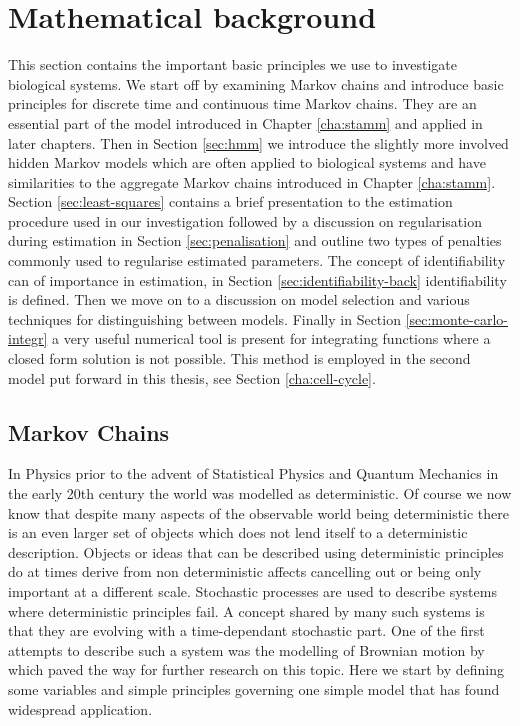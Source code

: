 \section{Mathematical background}
\label{sec:math-backgr}

This section contains the important basic principles we use to investigate biological systems. We start off by examining Markov chains and introduce basic principles for discrete time and continuous time Markov chains. They  are an essential part of the model introduced in Chapter \ref{cha:stamm} and applied in later chapters. Then in Section \ref{sec:hmm} we introduce the slightly more involved hidden Markov models which are often applied to biological systems and have similarities to the aggregate Markov chains introduced in Chapter \ref{cha:stamm}. Section \ref{sec:least-squares} contains a brief presentation to the estimation procedure used in our investigation followed by a discussion on regularisation during estimation in Section \ref{sec:penalisation} and outline two types of penalties commonly used to regularise estimated parameters. The concept of identifiability can of importance in estimation, in Section \ref{sec:identifiability-back} identifiability is defined. Then we move on to a discussion on model selection and various techniques for distinguishing between models. Finally in Section \ref{sec:monte-carlo-integr} a very useful numerical tool is present for integrating functions where a closed form solution is not possible. This method is employed in the second model put forward in this thesis, see Section \ref{cha:cell-cycle}.

\subsection{Markov Chains}
\label{sec:markov-chains}

In Physics prior to the advent of Statistical Physics and Quantum Mechanics in the early 20th century the world was modelled as deterministic. Of course we now know that despite many aspects of the observable world being deterministic there is an even larger set of objects which does not lend itself to a deterministic description. Objects or ideas that can be described using deterministic principles do at times derive from non deterministic affects cancelling out or being only important at a different scale. Stochastic processes are used to describe systems where deterministic principles fail. A concept shared by many such systems is that they are evolving with a time-dependant stochastic part. One of the first attempts to describe such a system was the modelling of Brownian motion by \cite{Einstein:2005ww} which paved the way for further research on this topic. Here we start by defining some variables and simple principles governing one simple model that has found widespread application.

